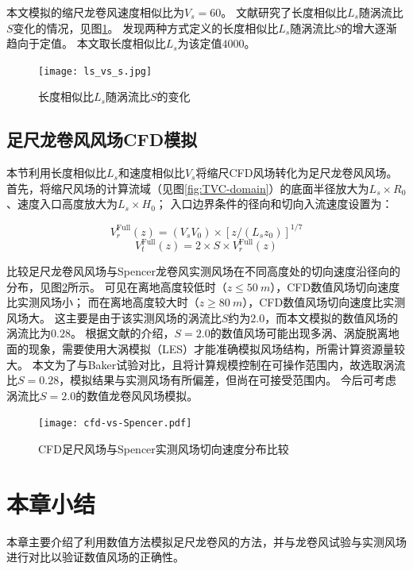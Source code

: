 本文模拟的缩尺龙卷风速度相似比为$V_s=60$。
文献\cite{hangan2008swirl}研究了长度相似比$L_s$随涡流比$S$变化的情况，见图\ref{fig:Ls-S}。
发现两种方式定义的长度相似比$L_s$随涡流比$S$的增大逐渐趋向于定值。
本文取长度相似比$L_s$为该定值$4000$。

\begin{figure}[!htbp]
	\centering
	\texttt{[image: ls\_vs\_s.jpg]}
	\caption{长度相似比$L_s$随涡流比$S$的变化\cite{hangan2008swirl}}
	\label{fig:Ls-S}
\end{figure}

\subsection{足尺龙卷风风场CFD模拟}\label{sec:full-tornado}
本节利用长度相似比$L_s$和速度相似比$V_s$将缩尺CFD风场转化为足尺龙卷风风场。
首先，将缩尺风场的计算流域（见图\ref{fig:TVC-domain}）的底面半径放大为$L_s\times R_0$、速度入口高度放大为$L_s \times H_0$；
入口边界条件的径向和切向入流速度设置为：

\begin{equation}
	V_r^{\text{Full}}(z) = (V_s V_0)\times\left[z/(L_s z_0)\right]^{1/7}
\end{equation}
\begin{equation}
	V_t^{\text{Full}}(z) = 2 \times S \times V_r^{\text{Full}}(z)
\end{equation}

比较足尺龙卷风风场与Spencer龙卷风实测风场在不同高度处的切向速度沿径向的分布，见图\ref{fig:cfd-Spencer}所示。
可见在离地高度较低时（$z \leq \SI{50}{m}$），CFD数值风场切向速度比实测风场小；
而在离地高度较大时（$z \geq \SI{80}{m} $），CFD数值风场切向速度比实测风场大。
这主要是由于该实测风场的涡流比$S$约为$2.0$\cite{hangan2008swirl}，而本文模拟的数值风场的涡流比为$0.28$。
根据文献\cite{natarajan2011numerical}的介绍，$S=2.0$的数值风场可能出现多涡、涡旋脱离地面的现象，需要使用大涡模拟（LES）才能准确模拟风场结构，所需计算资源量较大。
本文为了与Baker试验对比，且将计算规模控制在可操作范围内，故选取涡流比$S=0.28$，模拟结果与实测风场有所偏差，但尚在可接受范围内。
今后可考虑涡流比$S=2.0$的数值龙卷风风场模拟。

\begin{figure}[!htbp]
	\centering
	\texttt{[image: cfd-vs-Spencer.pdf]}
	\caption{CFD足尺风场与Spencer实测风场切向速度分布比较}
	\label{fig:cfd-Spencer}
\end{figure}

\section{本章小结}
本章主要介绍了利用数值方法模拟足尺龙卷风的方法，并与龙卷风试验与实测风场进行对比以验证数值风场的正确性。

